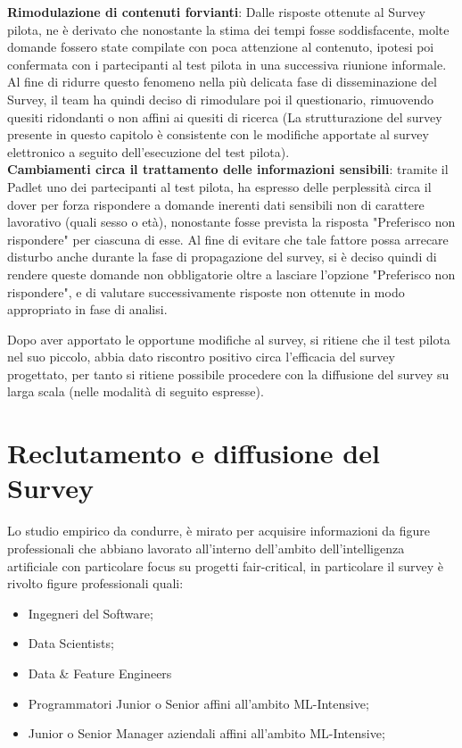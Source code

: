    \textbf{Rimodulazione di contenuti forvianti}:
   Dalle risposte ottenute al Survey pilota, ne è derivato che nonostante la stima dei tempi fosse soddisfacente, molte domande fossero state compilate con poca attenzione al contenuto, ipotesi poi confermata con i partecipanti al test pilota in una successiva riunione informale. Al fine di ridurre questo fenomeno nella più delicata fase di disseminazione del Survey, il team ha quindi deciso di rimodulare poi il questionario, rimuovendo quesiti ridondanti o non affini ai quesiti di ricerca (La strutturazione del survey presente in questo capitolo è consistente con le modifiche apportate al survey elettronico a seguito dell'esecuzione del test pilota). \\
   
   \textbf{Cambiamenti circa il trattamento delle informazioni sensibili}: 
   tramite il Padlet uno dei partecipanti al test pilota, ha espresso delle perplessità circa il dover per forza rispondere a domande inerenti dati sensibili non di carattere lavorativo (quali sesso o età), nonostante fosse prevista la risposta "Preferisco non rispondere" per ciascuna di esse.  Al fine di evitare che tale fattore possa arrecare disturbo anche durante la fase di propagazione del survey, si è deciso quindi di rendere queste domande non obbligatorie oltre a lasciare l'opzione "Preferisco non rispondere", e di valutare successivamente risposte non ottenute in modo appropriato in fase di analisi. 
   
   Dopo aver apportato le opportune modifiche al survey, si ritiene che il test pilota nel suo piccolo, abbia dato riscontro positivo circa l'efficacia del survey progettato, per tanto si ritiene possibile procedere con la diffusione del survey su larga scala (nelle modalità di seguito espresse).
    
    
    
    \section{Reclutamento e diffusione del Survey}
    
    Lo studio empirico da condurre, è mirato per acquisire informazioni da figure professionali che abbiano lavorato all'interno dell'ambito dell'intelligenza artificiale con particolare focus su progetti fair-critical, in particolare il survey è rivolto figure professionali quali:
    
        \begin{itemize}
            \item Ingegneri del Software;
            \item Data Scientists;
            \item Data \& Feature Engineers
            \item Programmatori Junior o Senior affini all'ambito ML-Intensive;
            \item Junior o Senior Manager aziendali affini all'ambito ML-Intensive;
        \end{itemize}
        
